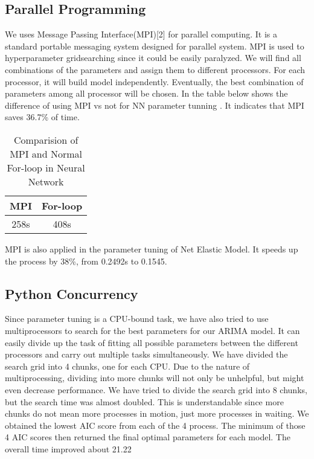 \documentclass[article, 10 pt, conference]{ieeeconf}
\begin{document}
\subsection{Parallel Programming}
We uses Message Passing Interface(MPI)[2] for parallel computing. It is a standard portable messaging system designed for parallel system. MPI is used to hyperparameter gridsearching since it could be easily paralyzed. We will find all combinations of the parameters and assign them to different processors. For each processor, it will build model independently. Eventually, the best combination of parameters among all processor will be chosen. In the table below shows the difference of using MPI vs not for NN parameter tunning . It indicates that MPI saves 36.7\% of time.

\begin{table}[h]
\caption{Comparision of MPI and Normal For-loop in Neural Network}
\label{table_example}
\begin{center}
\begin{tabular}{|c||c|}
\hline
MPI & For-loop\\
\hline
258s & 408s\\
\hline
\end{tabular}
\end{center}
\end{table}

MPI is also applied in the parameter tuning of Net Elastic Model. It speeds up the process by 38\%, from 0.2492s to 0.1545.


\subsection{Python Concurrency}
Since parameter tuning is a CPU-bound task, we have also tried to use multiprocessors to search for the best parameters for our ARIMA model. It can easily divide up the task of fitting all possible parameters between the different processors and carry out multiple tasks simultaneously. We have divided the search grid into 4 chunks, one for each CPU. Due to the nature of multiprocessing, dividing into more chunks will not only be unhelpful, but might even decrease performance. We have tried to divide the search grid into 8 chunks, but the search time was almost doubled. This is understandable since more chunks do not mean more processes in motion, just more processes in waiting. We obtained the lowest AIC score from each of the 4 process. The minimum of those 4 AIC scores then returned the final optimal parameters for each model. The overall time improved about 21.22%
\end{document}
